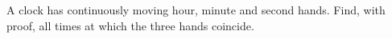 A clock has continuously moving hour, minute and second hands. Find, with proof, all times at which the three hands coincide.
